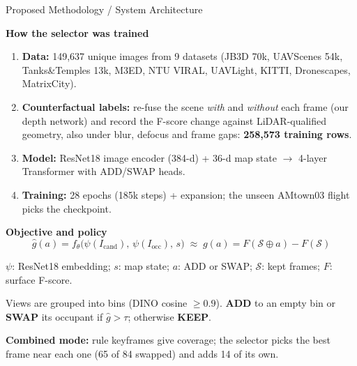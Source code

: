 \documentclass{article}
\newcommand{\smallsize}{\fontsize{13.5}{17}\selectfont}
\newcommand{\subhead}[1]{{\color{iitmaroon}\bfseries #1}}
\begin{document}
\begin{posterblock}{}{Proposed Methodology / System Architecture}
\vspace{0.4em}
\raggedright
\begin{minipage}[t]{0.55\linewidth}\vspace{0pt}
\subhead{How the selector was trained}
\begin{enumerate}
  \item \textbf{Data:} 149,637 unique images from 9 datasets
    (JB3D 70k, UAVScenes 54k, Tanks\&Temples 13k, M3ED, NTU VIRAL, UAVLight, KITTI, Dronescapes, MatrixCity).
  \item \textbf{Counterfactual labels:} re-fuse the scene \emph{with} and \emph{without} each frame
    (our depth network) and record the F-score change against LiDAR-qualified geometry, also under
    blur, defocus and frame gaps: \textbf{258,573 training rows}.
  \item \textbf{Model:} ResNet18 image encoder (384-d) + 36-d map state $\rightarrow$ 4-layer Transformer with ADD/SWAP heads.
  \item \textbf{Training:} 28 epochs (185k steps) + expansion; the unseen AMtown03 flight picks the checkpoint.
\end{enumerate}
\end{minipage}%
\hfill
\begin{minipage}[t]{0.42\linewidth}\vspace{0pt}
\subhead{Objective and policy}
\[ \hat g(a) = f_\theta\big(\psi(I_{\text{cand}}),\, \psi(I_{\text{occ}}),\, s\big)
   \;\approx\; g(a) = F(\mathcal{S}\oplus a) - F(\mathcal{S}) \]
{\smallsize $\psi$: ResNet18 embedding; $s$: map state; $a$: ADD or SWAP; $\mathcal{S}$: kept frames; $F$: surface F-score.\par}
\vspace{0.3em}
Views are grouped into bins (DINO cosine $\ge 0.9$). \textbf{ADD} to an empty bin or \textbf{SWAP} its
occupant if $\hat g > \tau$; otherwise \textbf{KEEP}.\par
\vspace{0.3em}
\textbf{Combined mode:} rule keyframes give coverage; the selector picks the best frame near
each one (65 of 84 swapped) and adds 14 of its own.
\end{minipage}
\end{posterblock}
\end{document}
